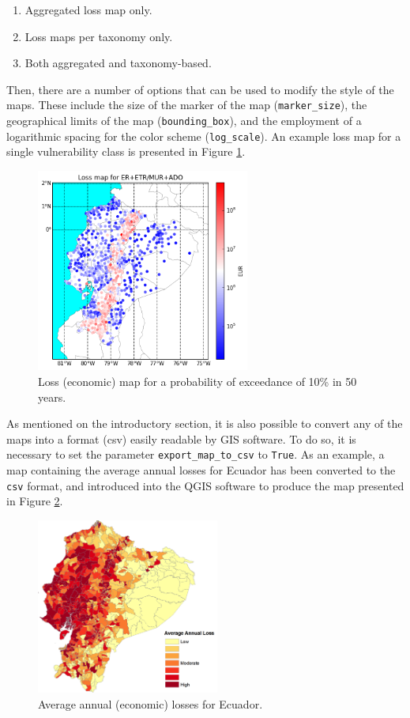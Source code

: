 \begin{enumerate}
\item Aggregated loss map only.
\item Loss maps per taxonomy only.
\item Both aggregated and taxonomy-based.\\
\end{enumerate}

Then, there are a number of options that can be used to modify the style of the maps. These include the size of the marker of the map (\verb=marker_size=), the geographical limits of the map (\verb=bounding_box=), and the employment of a logarithmic spacing for the color scheme (\verb=log_scale=). An example loss map for a single vulnerability class is presented in Figure \ref{fig:loss_map}.

\begin{figure}[htb]
  \centering
      \includegraphics[width=7cm]{Figures/loss_map.png}
  \caption{Loss (economic) map for a probability of exceedance of 10\% in 50 years.}
  \label{fig:loss_map}
\end{figure}

As mentioned on the introductory section, it is also possible to convert any of the maps into a format (csv) easily readable by GIS software. To do so, it is necessary to set the parameter \verb=export_map_to_csv= to \verb=True=. As an example, a map containing the average annual losses for Ecuador has been converted to the \verb=csv= format, and introduced into the QGIS software to produce the map presented in Figure \ref{fig:all_loss_map}.

\begin{figure}[htb]
  \centering
      \includegraphics[width=6cm]{Figures/loss_map_AAL.png}
  \caption{Average annual (economic) losses for Ecuador.}
  \label{fig:all_loss_map}
\end{figure}
